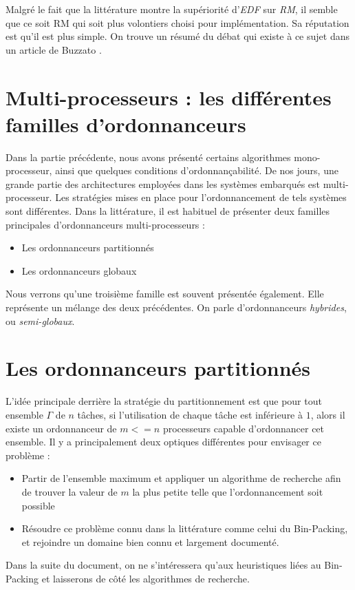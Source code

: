 \documentclass[11pt,a4paper,oneside]{report}
\begin{document}
	Malgré le fait que la littérature montre la supériorité d'\textit{EDF} sur \textit{RM}, 
	il semble que ce soit RM qui soit plus volontiers choisi pour implémentation. 
	Sa réputation est qu'il est plus simple. 
	On trouve un résumé du débat qui existe à ce sujet dans un article de Buzzato
	\cite{buttazzo_rate_2005}.
	
	\section{Multi-processeurs : les différentes familles d'ordonnanceurs}
	
	Dans la partie précédente, nous avons présenté certains algorithmes mono-processeur, 
	ainsi que quelques conditions d'ordonnançabilité.
	De nos jours, une grande partie des architectures employées dans les systèmes embarqués 
	est multi-processeur. 
	Les stratégies mises en place pour l'ordonnancement de tels 
	systèmes sont différentes. Dans la littérature, il est habituel de présenter 
	deux familles principales d'ordonnanceurs multi-processeurs :\medskip
	\begin{itemize}
		\item Les ordonnanceurs partitionnés
		\item Les ordonnanceurs globaux
	\end{itemize}
	Nous verrons qu'une troisième famille est souvent présentée également. Elle représente un 
	mélange des deux précédentes. On parle d'ordonnanceurs \textit{hybrides}, ou \textit{semi-globaux}.
	
	\section{Les ordonnanceurs partitionnés}
	L'idée principale derrière la stratégie du partitionnement est que pour tout 
	ensemble $\Gamma$ de $n$ tâches, si l'utilisation de chaque tâche est inférieure à $1$, 
	alors il existe un ordonnanceur de $m <= n$ processeurs capable d'ordonnancer cet ensemble. 
	Il y a principalement deux optiques différentes pour envisager ce problème : \medskip
	\begin{itemize}
		\item Partir de l'ensemble maximum et appliquer un algorithme de recherche afin de trouver 
		la valeur de $m$ la plus petite telle que l'ordonnancement soit possible
		\item Résoudre ce problème connu dans la littérature comme celui du Bin-Packing, 
		et rejoindre un domaine bien connu et largement documenté.
	\end{itemize}
	Dans la suite du document, on ne s'intéressera qu'aux heuristiques liées au Bin-Packing et 
	laisserons de côté les algorithmes de recherche.
	
\end{document}
